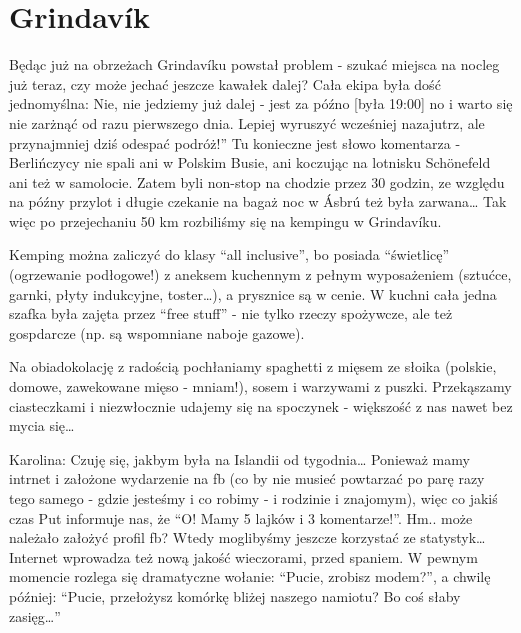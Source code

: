 \section*{Grindavík}

Będąc już na obrzeżach Grindavíku powstał problem - szukać miejsca na nocleg już teraz, czy może jechać jeszcze kawałek dalej? Cała ekipa była dość jednomyślna: Nie, nie jedziemy już dalej - jest za późno [była 19:00] no i warto się nie zarżnąć od razu pierwszego dnia. Lepiej wyruszyć wcześniej nazajutrz, ale przynajmniej dziś odespać podróż!” Tu konieczne jest słowo komentarza - Berlińczycy nie spali ani w Polskim Busie, ani koczując na lotnisku Schönefeld ani też w samolocie. Zatem byli non-stop na chodzie przez 30 godzin, ze względu na późny przylot i długie czekanie na bagaż noc w Ásbrú też była zarwana… Tak więc po przejechaniu 50 km rozbiliśmy się na kempingu w Grindavíku.

Kemping można zaliczyć do klasy “all inclusive”, bo posiada “świetlicę” (ogrzewanie podłogowe!) z aneksem kuchennym z pełnym wyposażeniem (sztućce, garnki, płyty indukcyjne, toster…), a prysznice są w cenie. W kuchni cała jedna szafka była zajęta przez “free stuff” - nie tylko rzeczy spożywcze, ale też gospdarcze (np. są wspomniane naboje gazowe).



Na obiadokolację z radością pochłaniamy spaghetti z mięsem ze słoika (polskie, domowe, zawekowane mięso - mniam!), sosem i warzywami z puszki. Przekąszamy ciasteczkami i niezwłocznie udajemy się na spoczynek - większość z nas nawet bez mycia się…


Karolina: Czuję się, jakbym była na Islandii od tygodnia…
Ponieważ mamy intrnet i założone wydarzenie na fb (co by nie musieć powtarzać po parę razy tego samego - gdzie jesteśmy i co robimy - i rodzinie i znajomym), więc co jakiś czas Put informuje nas, że “O! Mamy 5 lajków i 3 komentarze!”. Hm.. może należało założyć profil fb? Wtedy moglibyśmy jeszcze korzystać ze statystyk…
Internet wprowadza też nową jakość wieczorami, przed spaniem. W pewnym momencie rozlega się dramatyczne wołanie: “Pucie, zrobisz modem?”, a chwilę później: “Pucie, przełożysz komórkę bliżej naszego namiotu? Bo coś słaby zasięg…”
